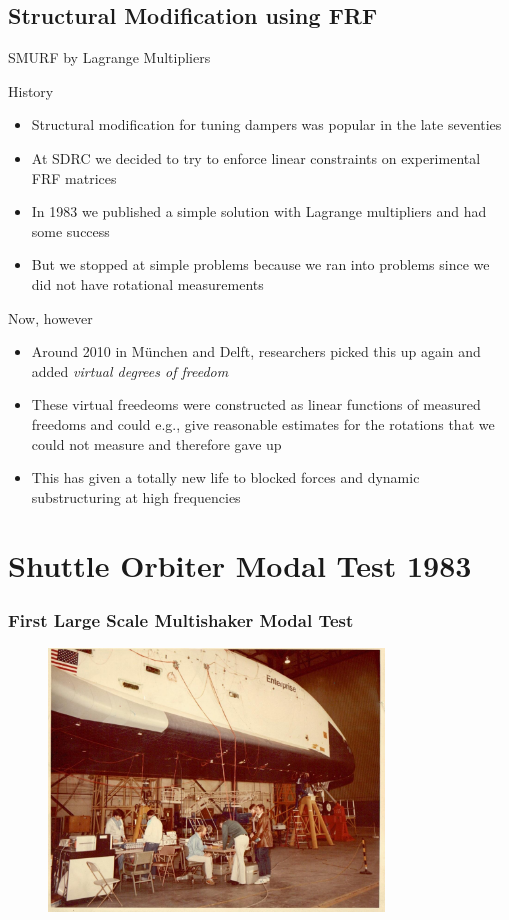 \documentclass[aspectratio=169,10pt]{beamer} \mode<presentation>
\begin{document}
\subsection{Structural Modification using FRF}
\begin{frame}[t]{SMURF by Lagrange Multipliers}
  \begin{block}{History}
    \begin{itemize}[<+->]
      \item Structural modification for tuning dampers was popular in the late seventies
      \item At SDRC we decided to try to enforce linear constraints on experimental FRF matrices
      \item In 1983 we published a simple solution with Lagrange multipliers and had some success
      \item But we stopped at simple problems because we ran into problems since we did not have rotational measurements
    \end{itemize}
  \end{block}
  \begin{block}{Now, however}
    \begin{itemize}[<+->]
      \item Around 2010 in M\"u{}nchen and Delft, researchers picked this up again and added \it{virtual degrees of freedom}
      \item These virtual freedeoms were constructed as linear functions of measured freedoms and could e.g., give reasonable estimates for the rotations that we could not measure and therefore gave up
      \item This has given a totally new life to blocked forces and dynamic substructuring at high frequencies
    \end{itemize}
  \end{block}
\end{frame}

\section{Shuttle Orbiter Modal Test 1983}

\begin{frame}
  \frametitle{First Large Scale Multishaker Modal Test}
  \begin{figure}
    \centering
    \includegraphics[width=0.65\linewidth,height=7cm]{SDRC-shuttle-1983}
  \end{figure}
\end{frame}
\end{document}
